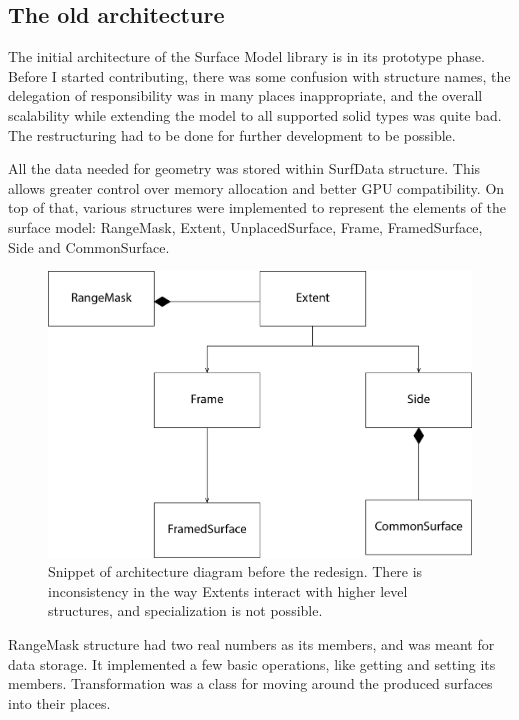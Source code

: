 \documentclass[12pt, a4paper]{article}
\begin{document}
\subsection{The old architecture}

The initial architecture of the Surface Model library is in its prototype phase. Before I started contributing, there was some confusion with structure names, the delegation of responsibility was in many places inappropriate, and the overall scalability while extending the model to all supported solid types was quite bad. The restructuring had to be done for further development to be possible.

All the data needed for geometry was stored within SurfData structure. This allows greater control over memory allocation and better GPU compatibility. On top of that, various structures were implemented to represent the elements of the surface model: RangeMask, Extent, UnplacedSurface, Frame, FramedSurface, Side and CommonSurface.

\begin{figure}[h]
	\includegraphics[width=\textwidth]{Figures/diagram_old.png}
	\caption{Snippet of architecture diagram before the redesign. There is inconsistency in the way Extents interact with higher level structures, and specialization is not possible.}
	\label{fig:oldarch}
\end{figure}

RangeMask structure had two real numbers as its members, and was meant for data storage. It implemented a few basic operations, like getting and setting its members. Transformation was a class for moving around the produced surfaces into their places.
\end{document}
